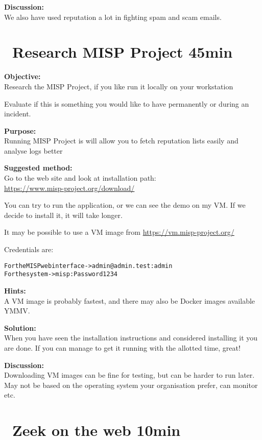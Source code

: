 \documentclass[a4paper,11pt,notitlepage]{report}
\begin{document}
{\bf Discussion:}\\
We also have used reputation a lot in fighting spam and scam emails.



\chapter{\faInfoCircle\ Research MISP Project 45min}
\label{ex:misp-install}


{\bf Objective:}\\
Research the MISP Project, if you like run it locally on your workstation

Evaluate if this is something you would like to have permanently or during an incident.

{\bf Purpose:}\\
Running MISP Project is  will allow you to fetch reputation lists easily and analyse logs better

{\bf Suggested method:}\\
Go to the web site and look at installation path:\\
\url{https://www.misp-project.org/download/}

You can try to run the application, or we can see the demo on my VM. If we decide to install it, it will take longer.

It may be possible to use a VM image from \url{https://vm.misp-project.org/}

Credentials are:
\begin{alltt}\footnotesize
For the MISP web interface -> admin@admin.test:admin
For the system -> misp:Password1234
\end{alltt}


{\bf Hints:}\\
A VM image is probably fastest, and there may also be Docker images available YMMV.

{\bf Solution:}\\
When you have seen the installation instructions and considered installing it you are done. If you can manage to get it running with the allotted time, great!

{\bf Discussion:}\\
Downloading VM images can be fine for testing, but can be harder to run later. May not be based on the operating system your organisation prefer, can monitor etc.


\chapter{\faExclamationTriangle\ Zeek on the web 10min}
\label{ex:zeekweb}
\end{document}
